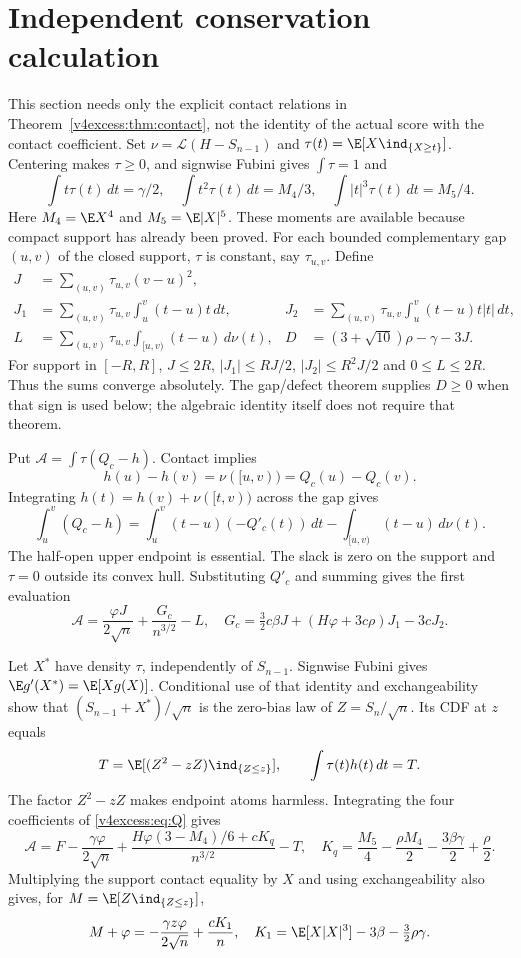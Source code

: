 \section{Independent conservation calculation}
This section needs only the explicit contact relations in
Theorem~\ref{v4excess:thm:contact}, not the identity of the actual score with the
contact coefficient. Set $\nu=\mathcal L(H-S_{n-1})$ and
$\tau(t)=\E[X\ind_{\{X\ge t\}}]$. Centering makes $\tau\ge0$, and
signwise Fubini gives $\int\tau=1$ and
\[
 \int t\tau(t)\,dt=\gamma/2,\quad
 \int t^2\tau(t)\,dt=M_4/3,\quad
 \int |t|^3\tau(t)\,dt=M_5/4.
\]
Here $M_4=\E X^4$ and $M_5=\E|X|^5$.
These moments are available because compact support has already been
proved. For each bounded complementary gap $(u,v)$ of the closed support,
$\tau$ is constant, say $\tau_{u,v}$. Define
\begin{align*}
 J&=\sum_{(u,v)}\tau_{u,v}(v-u)^2,\\
 J_1&=\sum_{(u,v)}\tau_{u,v}\int_u^v(t-u)t\,dt,
 &J_2&=\sum_{(u,v)}\tau_{u,v}\int_u^v(t-u)t|t|\,dt,\\
 L&=\sum_{(u,v)}\tau_{u,v}\int_{[u,v)}(t-u)\,d\nu(t),
 &D&=(3+\sqrt{10})\rho-\gamma-3J.
\end{align*}
For support in $[-R,R]$, $J\le2R$, $|J_1|\le RJ/2$,
$|J_2|\le R^2J/2$ and $0\le L\le2R$. Thus the sums converge absolutely.
The gap/defect theorem supplies $D\ge0$ when that sign is used below;
the algebraic identity itself does not require that theorem.

Put $\mathcal A=\int\tau(Q_c-h)$. Contact implies
\[
 h(u)-h(v)=\nu([u,v))=Q_c(u)-Q_c(v).
\]
Integrating $h(t)=h(v)+\nu([t,v))$ across the gap gives
\[
 \int_u^v(Q_c-h)
 =\int_u^v(t-u)(-Q'_c(t))\,dt-\int_{[u,v)}(t-u)\,d\nu(t).
\]
The half-open upper endpoint is essential. The slack is zero on the
support and $\tau=0$ outside its convex hull. Substituting $Q'_c$ and
summing gives the first evaluation
\begin{equation}\label{v4excess:eq:first}
 \mathcal A=\frac{\varphi J}{2\sqrt n}+\frac{G_c}{n^{3/2}}-L,
 \quad G_c=\tfrac32c\beta J+(H\varphi+3c\rho)J_1-3cJ_2.
\end{equation}

Let $X^*$ have density $\tau$, independently of $S_{n-1}$. Signwise
Fubini gives $\E g'(X^*)=\E[Xg(X)]$. Conditional use of that identity
and exchangeability show that $(S_{n-1}+X^*)/\sqrt n$ is the zero-bias
law of $Z=S_n/\sqrt n$. Its CDF at $z$ equals
\[
 T=\E[(Z^2-zZ)\ind_{\{Z\le z\}}],
 \qquad\int\tau(t)h(t)\,dt=T.
\]
The factor $Z^2-zZ$ makes endpoint atoms harmless. Integrating the four
coefficients of \eqref{v4excess:eq:Q} gives
\begin{equation}\label{v4excess:eq:second}
 \mathcal A=F-\frac{\gamma\varphi}{2\sqrt n}
 +\frac{H\varphi(3-M_4)/6+cK_q}{n^{3/2}}-T,
 \quad K_q=\frac{M_5}4-\frac{\rho M_4}2-\frac{3\beta\gamma}2+\frac\rho2.
\end{equation}
Multiplying the support contact equality by $X$ and using exchangeability
also gives, for $M=\E[Z\ind_{\{Z\le z\}}]$,
\begin{equation}\label{v4excess:eq:firstmoment}
 M+\varphi=-\frac{\gamma z\varphi}{2\sqrt n}+\frac{cK_1}{n},
 \quad K_1=\E[X|X|^3]-3\beta-\tfrac32\rho\gamma.
\end{equation}

